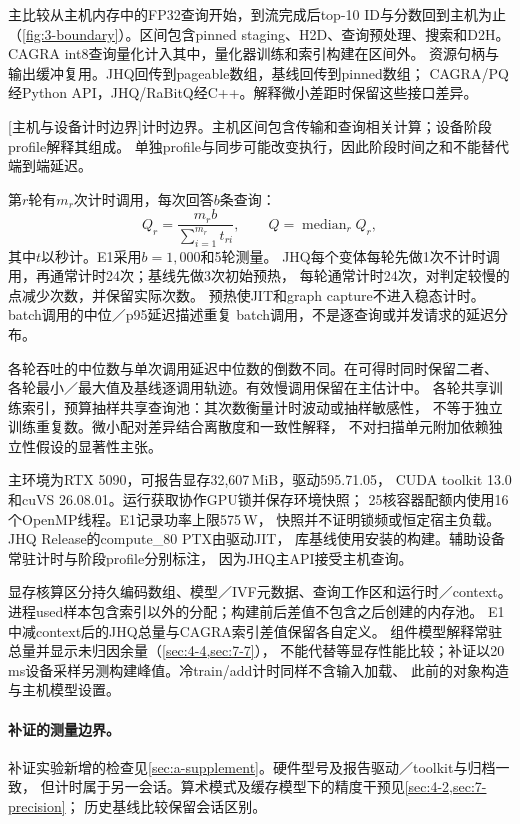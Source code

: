 主比较从主机内存中的FP32查询开始，到流完成后top-10 ID与分数回到主机为止
（\cref{fig:3-boundary}）。区间包含pinned staging、H2D、查询预处理、搜索和D2H。
CAGRA int8查询量化计入其中，量化器训练和索引构建在区间外。
资源句柄与输出缓冲复用。JHQ回传到pageable数组，基线回传到pinned数组；
CAGRA/PQ经Python API，JHQ/RaBitQ经C++。解释微小差距时保留这些接口差异。

\par\medskip\noindent\begin{minipage}{\linewidth}
\centering\captionsetup{hypcap=false}
\resizebox{\linewidth}{!}{}
[主机与设备计时边界]{计时边界。主机区间包含传输和查询相关计算；设备阶段profile解释其组成。
单独profile与同步可能改变执行，因此阶段时间之和不能替代端到端延迟。}
\label{fig:3-boundary}
\end{minipage}\par\medskip

第$r$轮有$m_r$次计时调用，每次回答$b$条查询：
\begin{equation}
Q_r=\frac{m_rb}{\sum_{i=1}^{m_r}t_{ri}},\qquad
Q=\operatorname{median}_r Q_r,
\label{eq:3-throughput}
\end{equation}
其中$t$以秒计。E1采用$b=1{,}000$和5轮测量。
JHQ每个变体每轮先做1次不计时调用，再通常计时24次；基线先做3次初始预热，
每轮通常计时24次，对判定较慢的点减少次数，并保留实际次数。
预热使JIT和graph capture不进入稳态计时。batch调用的中位／p95延迟描述重复
batch调用，不是逐查询或并发请求的延迟分布。

各轮吞吐的中位数与单次调用延迟中位数的倒数不同。在可得时同时保留二者、
各轮最小／最大值及基线逐调用轨迹。有效慢调用保留在主估计中。
各轮共享训练索引，预算抽样共享查询池：其次数衡量计时波动或抽样敏感性，
不等于独立训练重复数。微小配对差异结合离散度和一致性解释，
不对扫描单元附加依赖独立性假设的显著性主张。

主环境为RTX 5090，可报告显存32,607\,MiB，驱动595.71.05，
CUDA toolkit 13.0和cuVS 26.08.01。运行获取协作GPU锁并保存环境快照；
25核容器配额内使用16个OpenMP线程。E1记录功率上限575\,W，
快照并不证明锁频或恒定宿主负载。JHQ Release的compute\_80 PTX由驱动JIT\cite{cuda_platform}，
库基线使用安装的构建。辅助设备常驻计时与阶段profile分别标注，
因为JHQ主API接受主机查询。

显存核算区分持久编码数组、模型／IVF元数据、查询工作区和运行时／context。
进程used样本包含索引以外的分配；构建前后差值不包含之后创建的内存池。
E1中减context后的JHQ总量与CAGRA索引差值保留各自定义。
组件模型解释常驻总量并显示未归因余量（\cref{sec:4-4,sec:7-7}），
不能代替等显存性能比较；补证以20\,ms设备采样另测构建峰值。冷train/add计时同样不含输入加载、
此前的对象构造与主机模型设置。

\paragraph{补证的测量边界。}
补证实验新增的检查见\cref{sec:a-supplement}。硬件型号及报告驱动／toolkit与归档一致，
但计时属于另一会话。算术模式及缓存模型下的精度干预见\cref{sec:4-2,sec:7-precision}；
历史基线比较保留会话区别。
